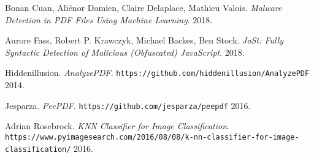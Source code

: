 \documentclass{article}
\begin{document}
\begin{thebibliography}{9}
Bonan Cuan, Aliénor Damien, Claire Delaplace, Mathieu Valois.
\textit{Malware Detection in PDF Files Using Machine Learning}.
2018.

Aurore Fass, Robert P. Krawczyk, Michael Backes, Ben Stock.
\textit{JaSt: Fully Syntactic Detection of Malicious (Obfuscated) JavaScript}.
2018.

Hiddenillusion.
\textit{AnalyzePDF}. 
\texttt{https://github.com/hiddenillusion/AnalyzePDF}
2014.

Jesparza.
\textit{PeePDF}. 
\texttt{https://github.com/jesparza/peepdf}
2016.

Adrian Rosebrock.
\textit{KNN Classifier for Image Classification}. 
\texttt{https://www.pyimagesearch.com/2016/08/08/k-nn-classifier-for-image-classification/}
2016.

\end{thebibliography}
\end{document}

